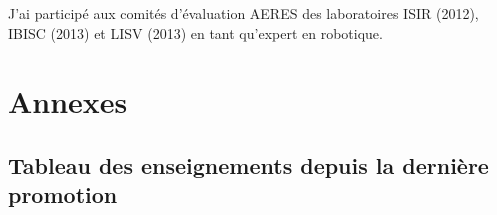 \documentclass[a4paper,12pt]{article}
\newcommand{\Separation}{\noindent{\color{black!40}\rule{\textwidth}{2pt}}}
\newcommand{\instructions}[1]{{\color{black}#1}}
\begin{document}
J'ai participé aux comités d'évaluation AERES des laboratoires ISIR (2012), IBISC (2013) et LISV (2013) en tant qu'expert en robotique.

\Separation{}










\newpage
\appendix

\section{Annexes}


\subsection{Tableau des enseignements depuis la dernière promotion}
\label{sec:annexe_enseignements}

\end{document}
